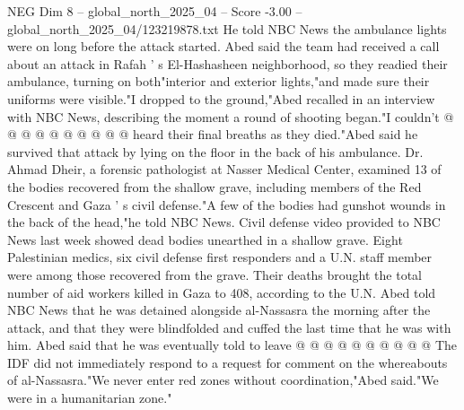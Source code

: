 \begin{textsample}{NEG Dim 8 – global\_north\_2025\_04 – Score -3.00 – global\_north\_2025\_04/123219878.txt}
He told NBC News the ambulance lights were on long before the attack started.
Abed said the team had received a call about an attack in Rafah ' s El-Hashasheen neighborhood, so they readied their ambulance, turning on both"interior and exterior lights,"and made sure their uniforms were visible."I dropped to the ground,"Abed recalled in an interview with NBC News, describing the moment a round of shooting began."I couldn't @ @ @ @ @ @ @ @ @ @ heard their final breaths as they died."Abed said he survived that attack by lying on the floor in the back of his ambulance.
Dr.
Ahmad Dheir, a forensic pathologist at Nasser Medical Center, examined 13 of the bodies recovered from the shallow grave, including members of the Red Crescent and Gaza ' s civil defense."A few of the bodies had gunshot wounds in the back of the head,"he told NBC News.
Civil defense video provided to NBC News last week showed dead bodies unearthed in a shallow grave.
Eight Palestinian medics, six civil defense first responders and a U.N. staff member were among those recovered from the grave.
Their deaths brought the total number of aid workers killed in Gaza to 408, according to the U.N.
Abed told NBC News that he was detained alongside al-Nassasra the morning after the attack, and that they were blindfolded and cuffed the last time that he was with him.
Abed said that he was eventually told to leave @ @ @ @ @ @ @ @ @ @ The IDF did not immediately respond to a request for comment on the whereabouts of al-Nassasra."We never enter red zones without coordination,"Abed said."We were in a humanitarian zone."

\end{textsample}
